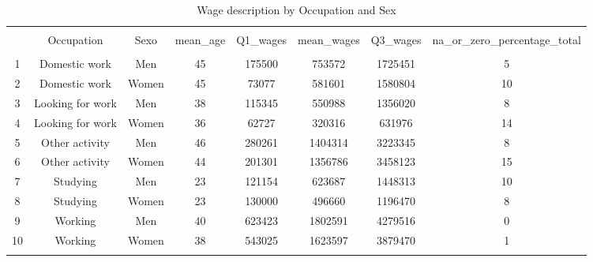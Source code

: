 
\begin{table}[!htbp] \centering 
  \caption{Wage description by Occupation and Sex} 
  \label{tab:WAGES} 
\begin{tabular}{@{\extracolsep{5pt}} cccccccc} 
\\[-1.8ex]\hline 
\hline \\[-1.8ex] 
 & Occupation & Sexo & mean\_age & Q1\_wages & mean\_wages & Q3\_wages & na\_or\_zero\_percentage\_total \\ 
\hline \\[-1.8ex] 
1 & Domestic work & Men & 45 & 175500 & 753572 & 1725451 & 5 \\ 
2 & Domestic work & Women & 45 & 73077 & 581601 & 1580804 & 10 \\ 
3 & Looking for work & Men & 38 & 115345 & 550988 & 1356020 & 8 \\ 
4 & Looking for work & Women & 36 & 62727 & 320316 & 631976 & 14 \\ 
5 & Other activity & Men & 46 & 280261 & 1404314 & 3223345 & 8 \\ 
6 & Other activity & Women & 44 & 201301 & 1356786 & 3458123 & 15 \\ 
7 & Studying & Men & 23 & 121154 & 623687 & 1448313 & 10 \\ 
8 & Studying & Women & 23 & 130000 & 496660 & 1196470 & 8 \\ 
9 & Working & Men & 40 & 623423 & 1802591 & 4279516 & 0 \\ 
10 & Working & Women & 38 & 543025 & 1623597 & 3879470 & 1 \\ 
\hline \\[-1.8ex] 
\end{tabular} 
\end{table} 
